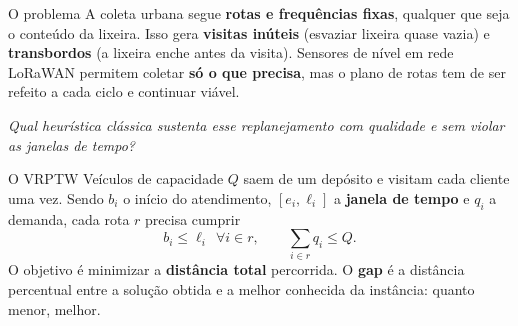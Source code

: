 \documentclass[portrait,a0paper,fontscale=0.285]{baposter}
\begin{document}
\begin{poster}


\begin{posterbox}[name=problema,column=0,below=resumo]{O problema}
A coleta urbana segue \textbf{rotas e frequências fixas}, qualquer que seja o
conteúdo da lixeira. Isso gera \textbf{visitas inúteis} (esvaziar lixeira quase
vazia) e \textbf{transbordos} (a lixeira enche antes da visita). Sensores de
nível em rede LoRaWAN permitem coletar \textbf{só o que precisa}, mas o plano
de rotas tem de ser refeito a cada ciclo e continuar viável.

\vspace{0.3em}
\textit{Qual heurística clássica sustenta esse replanejamento com qualidade e
sem violar as janelas de tempo?}
\end{posterbox}

\begin{posterbox}[name=vrptw,column=0,below=problema]{O VRPTW}
Veículos de capacidade $Q$ saem de um depósito e visitam cada cliente uma vez.
Sendo $b_i$ o início do atendimento, $[e_i,\ell_i]$ a \textbf{janela de tempo} e
$q_i$ a demanda, cada rota $r$ precisa cumprir
\[
  b_i \le \ell_i \ \ \forall i \in r, \qquad \textstyle\sum_{i\in r} q_i \le Q .
\]
O objetivo é minimizar a \textbf{distância total} percorrida. O \textbf{gap} é
a distância percentual entre a solução obtida e a melhor conhecida da instância:
quanto menor, melhor.
\end{posterbox}


\end{poster}
\end{document}
